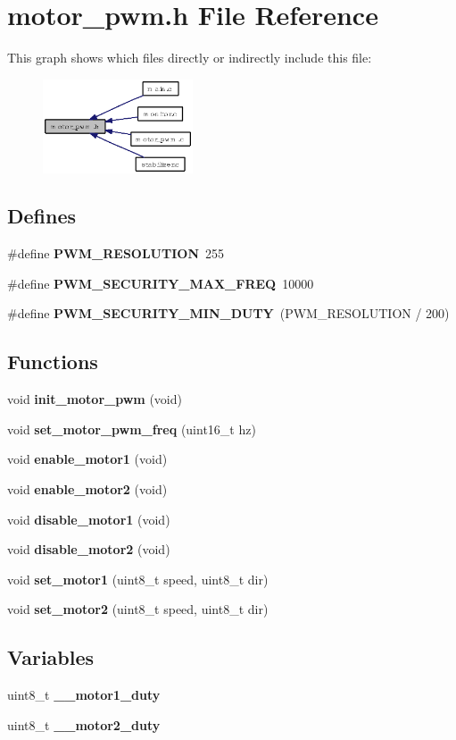 \section{motor\_\-pwm.h File Reference}
\label{motor__pwm_8h}


This graph shows which files directly or indirectly include this file:\begin{figure}[H]
\begin{center}
\leavevmode
\includegraphics[width=126pt]{motor__pwm_8h__dep__incl}
\end{center}
\end{figure}
\subsection*{Defines}
\begin{CompactItemize}
\item 
\#define {\bf PWM\_\-RESOLUTION}~255
\item 
\#define {\bf PWM\_\-SECURITY\_\-MAX\_\-FREQ}~10000
\item 
\#define {\bf PWM\_\-SECURITY\_\-MIN\_\-DUTY}~(PWM\_\-RESOLUTION / 200)
\end{CompactItemize}
\subsection*{Functions}
\begin{CompactItemize}
\item 
void {\bf init\_\-motor\_\-pwm} (void)
\item 
void {\bf set\_\-motor\_\-pwm\_\-freq} (uint16\_\-t hz)
\item 
void {\bf enable\_\-motor1} (void)
\item 
void {\bf enable\_\-motor2} (void)
\item 
void {\bf disable\_\-motor1} (void)
\item 
void {\bf disable\_\-motor2} (void)
\item 
void {\bf set\_\-motor1} (uint8\_\-t speed, uint8\_\-t dir)
\item 
void {\bf set\_\-motor2} (uint8\_\-t speed, uint8\_\-t dir)
\end{CompactItemize}
\subsection*{Variables}
\begin{CompactItemize}
\item 
uint8\_\-t {\bf \_\-\_\-motor1\_\-duty}
\item 
uint8\_\-t {\bf \_\-\_\-motor2\_\-duty}
\end{CompactItemize}
